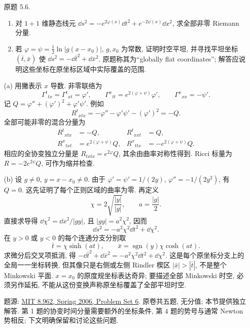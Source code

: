 \begin{exercise}
原题 5.6.
\begin{enumerate}[label=(\alph*)]
\item 对 $1+1$ 维静态线元 $\dd s^2=-e^{2\varphi(x)}\dd t^2+e^{-2\psi(x)}\dd x^2$, 求全部非零 Riemann 分量.
\item 若 $\varphi=\psi=\tfrac12\ln|g(x-x_0)|$, $g,x_0$ 为常数, 证明时空平坦, 并寻找平坦坐标 $(\bar t,\bar x)$ 使 $\dd s^2=-\dd\bar t^2+\dd\bar x^2$. 原题称其为“globally flat coordinates”; 解答应说明这些坐标在原坐标区域中实际覆盖的范围.
\end{enumerate}
\end{exercise}
\begin{solution}
(a) 用撇表示 $x$ 导数. 非零联络为
\[
\Gamma^t{}_{tx}=\Gamma^t{}_{xt}=\varphi',\qquad
\Gamma^x{}_{tt}=e^{2(\varphi+\psi)}\varphi',\qquad
\Gamma^x{}_{xx}=-\psi'.
\]
记 $Q=\varphi''+(\varphi')^2+\varphi'\psi'$. 例如
\[
R^t{}_{xtx}=-\varphi''-\varphi'\psi'-(\varphi')^2=-Q.
\]
全部可能非零的混合分量为
\begin{align*}
R^t{}_{xtx}&=-Q,&R^t{}_{xxt}&=Q,\\
R^x{}_{txt}&=e^{2(\varphi+\psi)}Q,&
R^x{}_{ttx}&=-e^{2(\varphi+\psi)}Q.
\end{align*}
相应的全协变独立分量是 $R_{txtx}=e^{2\varphi}Q$, 其余由曲率对称性得到. Ricci 标量为 $R=-2e^{2\psi}Q$, 可作为缩并检查.

(b) 设 $g\ne0$, $y=x-x_0\ne0$. 由于 $\varphi'=\psi'=1/(2y)$, $\varphi''=-1/(2y^2)$, 有 $Q=0$. 这先证明了每个正则区域的曲率为零. 再定义
\[
\chi=2\sqrt{\frac{|y|}{|g|}},\qquad a=\frac{|g|}{2}.
\]
直接求导得 $\dd\chi^2=\dd x^2/|gy|$, 且 $|gy|=a^2\chi^2$, 因而
\[
\dd s^2=-a^2\chi^2\dd t^2+\dd\chi^2.
\]
在 $y>0$ 或 $y<0$ 的每个连通分支分别取
\[
\bar t=\chi\sinh(at),\qquad
\bar x=\operatorname{sgn}(y)\chi\cosh(at).
\]
求微分后交叉项抵消, 得 $-\dd\bar t^2+\dd\bar x^2=-a^2\chi^2\dd t^2+\dd\chi^2$. 这是每个原坐标分支上的全局一一坐标转换, 但其像只是右侧或左侧 Rindler 楔区 $|\bar x|>|\bar t|$, 不是整个 Minkowski 平面. $x=x_0$ 的原度规坐标表达奇异; 要描述全部 Minkowski 时空, 必须另作延拓, 不能从这份变换声称原坐标覆盖了全部平坦时空.
\end{solution}

\label{sec:gr-ps06}

题源: \href{https://ocw.mit.edu/courses/8-962-general-relativity-spring-2020/resources/mit8_962s20_pset06/}{MIT 8.962, Spring 2006, Problem Set 6}. 原卷共五题, 无分值; 本节提供独立解答. 第 1 题的协变时间分量需要额外的坐标条件, 第 4 题的势号与通常 Newton 势相反; 下文明确保留和讨论这些问题.

